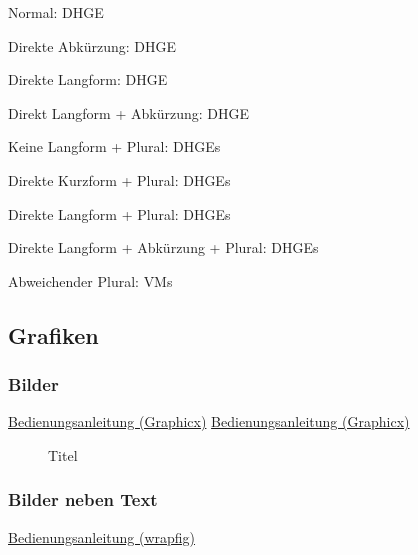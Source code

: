 Normal:                                   \ac{DHGE}

Direkte Abkürzung:                        \acs{DHGE}

Direkte Langform:                         \acl{DHGE}

Direkt Langform + Abkürzung:              \acf{DHGE}

Keine Langform + Plural:                  \acp{DHGE}

Direkte Kurzform + Plural:                \acsp{DHGE}

Direkte Langform + Plural:                \acfp{DHGE}

Direkte Langform + Abkürzung + Plural:    \aclp{DHGE}

Abweichender Plural:                      \acp{VM}
\newpage


\subsection{Grafiken}

\subsubsection{Bilder}

\href{https://texdoc.org/serve/graphicx.pdf/0}{Bedienungsanleitung (Graphicx)}
\href{https://en.wikibooks.org/wiki/LaTeX/Importing_Graphics}{Bedienungsanleitung (Graphicx)}

\par\medskip
\begin{figure}[!ht]
    \centering
    \caption[Titel in Abbildungsverzeichnis]{Titel\footnotemark}
    \label{fig:ExampleImage}
\end{figure}
\newpage

\subsubsection{Bilder neben Text}

\href{https://ctan.ebinger.cc/tex-archive/macros/latex/contrib/wrapfig/wrapfig-doc.pdf}{Bedienungsanleitung (wrapfig)}

